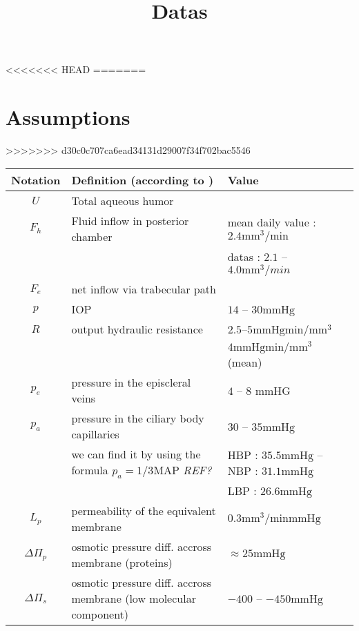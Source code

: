 \documentclass[11pt]{article}
\author{}
\title{Datas}
\date{}
\begin{document}
\maketitle
<<<<<<< HEAD
=======
\section{Assumptions}
>>>>>>> d30c0c707ca6ead34131d29007f34f702bac5546
\begin{center}
\begin{tabular}{|c|p{}|l|}
\hline
Notation & Definition (according to \cite{lyubimov2007dynamics}) & Value \\
\hline
\hline
$U$ & Total aqueous humor & \\
\hline
$F_h$ & Fluid inflow in posterior chamber & mean daily value : $2.4 \mathrm{mm}^3/\mathrm{min}$ \\
&& datas : $2.1$ -- $4.0 \mathrm{mm}^3/min$\\
\hline
$F_e$ & net inflow via trabecular path & \\
 \hline
 $p$ & IOP & $14$ -- $30 \mathrm{mmHg}$\\
 \hline
 $R$ & output hydraulic resistance & $2.5$--$5 \mathrm{mmHgmin}/\mathrm{mm}^3$ \cite{lyubimov2007dynamics}\\
 && $4\mathrm{mmHgmin}/\mathrm{mm}^3$ (mean) \cite{bill1975blood}\\
 \hline
 $p_e$ & pressure in the episcleral veins & $4$ -- $8$ $\mathrm{mmHG} $\\
 \hline
 $p_a$ & pressure in the ciliary body capillaries & $30$ -- $35 \mathrm{mmHg}$ \cite{lyubimov2007dynamics}\\
 &we can find it by using the formula $p_a = 1/3 \mathrm{MAP} $ \textit{REF?} & HBP : $35.5 \mathrm{mmHg} $ -- NBP : $31.1\mathrm{mmHg}$  \\
 && LBP : $26.6\mathrm{mmHg}$\\
 \hline
 $L_p$ & permeability of the equivalent membrane & $0.3 \mathrm{mm^3}/\mathrm{minmmHg}$\\
 \hline
 $\Delta \Pi_p $& osmotic pressure diff. accross membrane (proteins) &$\approx 25 \mathrm{mmHg}$\\
 \hline
 $\Delta \Pi_s $&osmotic pressure diff. accross membrane (low molecular component)& $-400$ -- $-450 \mathrm{mmHg}$\\

\end{tabular}
\end{center}
\end{document}
